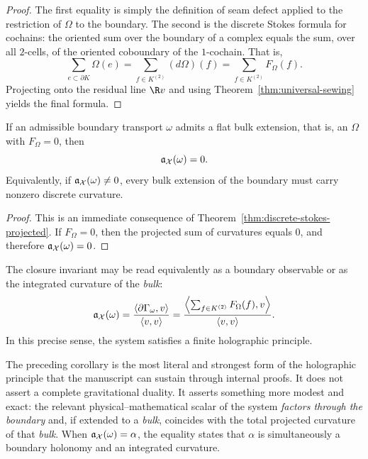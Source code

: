 \begin{proof}
The first equality is simply the definition of seam defect applied to the restriction of
$\Omega$ to the boundary. The second is the discrete Stokes formula for cochains: the oriented sum
over the boundary of a complex equals the sum, over all $2$-cells, of the oriented
coboundary of the $1$-cochain. That is,
\[
\sum_{e\subset \partial K}\Omega(e)=\sum_{f\in K^{(2)}}(d\Omega)(f)=\sum_{f\in K^{(2)}}F_\Omega(f).
\]
Projecting onto the residual line $\R v$ and using
Theorem~\ref{thm:universal-sewing} yields the final formula.
\end{proof}

\begin{corollary}\label{cor:no-flat-bulk}
If an admissible boundary transport $\omega$ admits a flat bulk extension,
that is, an $\Omega$ with $F_\Omega=0$, then
\[
\mathfrak a_\mathcal X(\omega)=0.
\]
Equivalently, if $\mathfrak a_\mathcal X(\omega)\neq 0$, every bulk extension of the boundary must carry
nonzero discrete curvature.
\end{corollary}

\begin{proof}
This is an immediate consequence of Theorem~\ref{thm:discrete-stokes-projected}. If
$F_\Omega=0$, then the projected sum of curvatures equals $0$, and therefore
$\mathfrak a_\mathcal X(\omega)=0$.
\end{proof}

\begin{corollary}\label{cor:finite-holography}
The closure invariant may be read equivalently as a boundary observable or as the integrated
curvature of the \emph{bulk}:
\[
\mathfrak a_\mathcal X(\omega)
=
\frac{\langle \partial\Gamma_\omega,v\rangle}{\langle v,v\rangle}
=
\frac{\left\langle \sum_{f\in K^{(2)}}F_\Omega(f),v\right\rangle}{\langle v,v\rangle}.
\]
In this precise sense, the system satisfies a finite holographic principle.
\end{corollary}

\begin{remark}
The preceding corollary is the most literal and strongest form of the holographic principle that the manuscript
can sustain through internal proofs. It does not assert a complete gravitational duality. It asserts something more
modest and exact: the relevant physical--mathematical scalar of the system \emph{factors through the boundary} and,
if extended to a \emph{bulk}, coincides with the total projected curvature of that \emph{bulk}.
When $\mathfrak a_\mathcal X(\omega)=\alpha$, the equality states that $\alpha$ is simultaneously a boundary
holonomy and an integrated curvature.
\end{remark}


